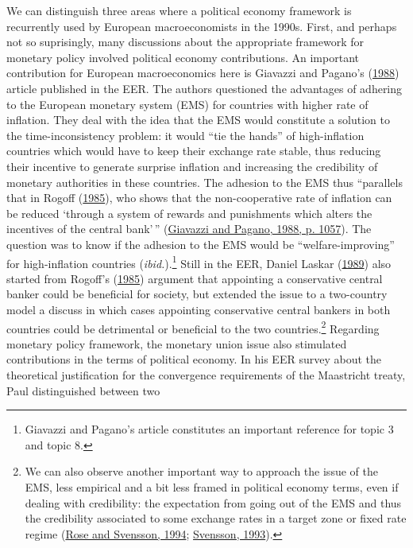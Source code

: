 \documentclass[]{elsarticle} %
\begin{document}
We can distinguish three areas where a political economy framework is
recurrently used by European macroeconomists in the 1990s. First, and
perhaps not so suprisingly, many discussions about the appropriate
framework for monetary policy involved political economy contributions.
An important contribution for European macroeconomics here is Giavazzi
and Pagano's (\protect\hyperlink{ref-giavazzi1988}{1988}) article
published in the EER. The authors questioned the advantages of adhering
to the European monetary system (EMS) for countries with higher rate of
inflation. They deal with the idea that the EMS would constitute a
solution to the time-inconsistency problem: it would ``tie the hands''
of high-inflation countries which would have to keep their exchange rate
stable, thus reducing their incentive to generate surprise inflation and
increasing the credibility of monetary authorities in these countries.
The adhesion to the EMS thus ``parallels that in Rogoff
(\protect\hyperlink{ref-rogoff1985b}{1985}), who shows that the
non-cooperative rate of inflation can be reduced `through a system of
rewards and punishments which alters the incentives of the central
bank'\,'' (\protect\hyperlink{ref-giavazzi1988}{Giavazzi and Pagano,
1988, p. 1057}). The question was to know if the adhesion to the EMS
would be ``welfare-improving'' for high-inflation countries
(\emph{ibid.}).\footnote{Giavazzi and Pagano's article constitutes an
  important reference for topic 3 and topic 8.} Still in the EER, Daniel
Laskar (\protect\hyperlink{ref-laskar1989}{1989}) also started from
Rogoff's (\protect\hyperlink{ref-rogoff1985b}{1985}) argument that
appointing a conservative central banker could be beneficial for
society, but extended the issue to a two-country model a discuss in
which cases appointing conservative central bankers in both countries
could be detrimental or beneficial to the two countries.\footnote{We can
  also observe another important way to approach the issue of the EMS,
  less empirical and a bit less framed in political economy terms, even
  if dealing with credibility: the expectation from going out of the EMS
  and thus the credibility associated to some exchange rates in a target
  zone or fixed rate regime (\protect\hyperlink{ref-rose1994}{Rose and
  Svensson, 1994}; \protect\hyperlink{ref-svensson1993a}{Svensson,
  1993}).} Regarding monetary policy framework, the monetary union issue
also stimulated contributions in the terms of political economy. In his
EER survey about the theoretical justification for the convergence
requirements of the Maastricht treaty, Paul distinguished between two
\end{document}
